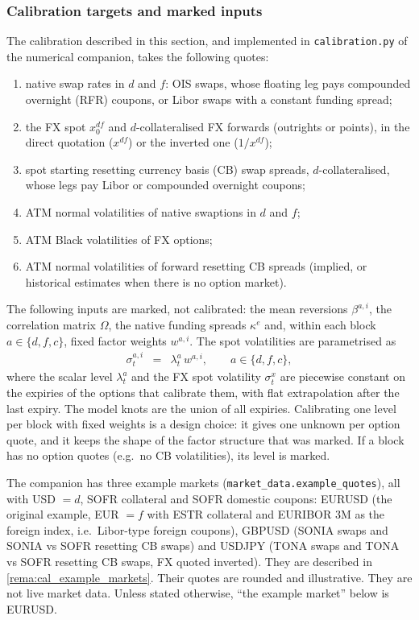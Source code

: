 \documentclass[11pt,english]{amsart}
\theoremstyle{definition}
\begin{document}
\subsubsection{Calibration targets and marked inputs}%
The calibration described in this section, and implemented in \texttt{calibration.py} of the numerical companion, takes the following quotes:
\begin{enumerate}
\item native swap rates in $d$ and $f$: OIS swaps, whose floating leg pays compounded overnight (RFR) coupons, or Libor swaps with a constant funding spread;
\item the FX spot $x^{df}_0$ and $d$-collateralised FX forwards (outrights or points), in the direct quotation ($x^{df}$) or the inverted one ($1/x^{df}$);
\item spot starting resetting currency basis (CB) swap spreads, $d$-collateralised, whose legs pay Libor or compounded overnight coupons;
\item ATM normal volatilities of native swaptions in $d$ and $f$;
\item ATM Black volatilities of FX options;
\item ATM normal volatilities of forward resetting CB spreads (implied, or historical estimates when there is no option market).
\end{enumerate}
The following inputs are marked, not calibrated: the mean reversions $\beta^{a,i}$, the correlation matrix $\Omega$, the native funding spreads $\kappa^e$ and, within each block $a\in\{d,f,c\}$, fixed factor weights $w^{a,i}$. The spot volatilities are parametrised as
\begin{eqnarray}
  \sigma^{a,i}_t &=& \lambda^a_t\, w^{a,i} , \qquad a\in\{d,f,c\},
\end{eqnarray}
where the scalar level $\lambda^a_t$ and the FX spot volatility $\sigma^x_t$ are piecewise constant on the expiries of the options that calibrate them, with flat extrapolation after the last expiry. The model knots are the union of all expiries. Calibrating one level per block with fixed weights is a design choice: it gives one unknown per option quote, and it keeps the shape of the factor structure that was marked. If a block has no option quotes (e.g.\ no CB volatilities), its level is marked.

The companion has three example markets (\texttt{market\_data.example\_quotes}), all with USD $= d$, SOFR collateral and SOFR domestic coupons: EURUSD (the original example, EUR $= f$ with ESTR collateral and EURIBOR 3M as the foreign index, i.e.\ Libor-type foreign coupons), GBPUSD (SONIA swaps and SONIA vs SOFR resetting CB swaps) and USDJPY (TONA swaps and TONA vs SOFR resetting CB swaps, FX quoted inverted). They are described in \autoref{rema:cal_example_markets}. Their quotes are rounded and illustrative. They are not live market data. Unless stated otherwise, ``the example market'' below is EURUSD.
\end{document}
